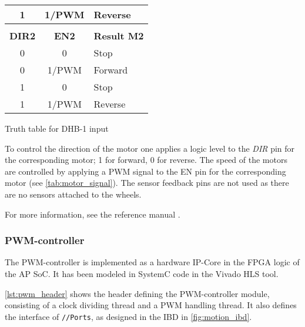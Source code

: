 \documentclass[Main]{subfiles}
\begin{document}
\begin{table}[h]
\begin{subtable}[b]{0.3\linewidth}
\begin{tabular}{ccl}
						\multicolumn{1}{|c|}{1}          & \multicolumn{1}{c|}{1/PWM}     & \multicolumn{1}{l|}{Reverse}         \\ \hline
						                                 &                                &                                      \\ \hline
						\multicolumn{1}{|c|}{{\bf DIR2}} & \multicolumn{1}{c|}{{\bf EN2}} & \multicolumn{1}{l|}{{\bf Result M2}} \\ \hline
						\multicolumn{1}{|c|}{0}          & \multicolumn{1}{c|}{0}         & \multicolumn{1}{l|}{Stop}            \\ \hline
						\multicolumn{1}{|c|}{0}          & \multicolumn{1}{c|}{1/PWM}     & \multicolumn{1}{l|}{Forward}         \\ \hline
						\multicolumn{1}{|c|}{1}          & \multicolumn{1}{c|}{0}         & \multicolumn{1}{l|}{Stop}            \\ \hline
						\multicolumn{1}{|c|}{1}          & \multicolumn{1}{c|}{1/PWM}     & \multicolumn{1}{l|}{Reverse}         \\ \hline
					\end{tabular}
					\caption{Truth table for DHB-1 input}
					\label{tab:motor_signal}
				\end{subtable}
				\caption{} 
			\end{table} 

			To control the direction of the motor one applies a logic level to the \emph{DIR} pin for the corresponding motor; 1 for forward, 0 for reverse.
			The speed of the motors are controlled by applying a PWM signal to the EN pin for the corresponding motor (see \autoref{tab:motor_signal}).
			The sensor feedback pins are not used as there are no sensors attached to the wheels.

			For more information, see the reference manual \cite{Digilent2013}.


		\subsubsection{PWM-controller} %
		\label{ssub:pwm_controller}
			
			The PWM-controller is implemented as a hardware IP-Core in the FPGA logic of the AP SoC.
			It has been modeled in SystemC code in the Vivado HLS tool.

			\autoref{lst:pwm_header} shows the header defining the PWM-controller module, consisting of a clock dividing thread and a PWM handling thread.
			It also defines the interface of \texttt{//Ports}, as designed in the IBD in \autoref{fig:motion_ibd}.
\end{document}
